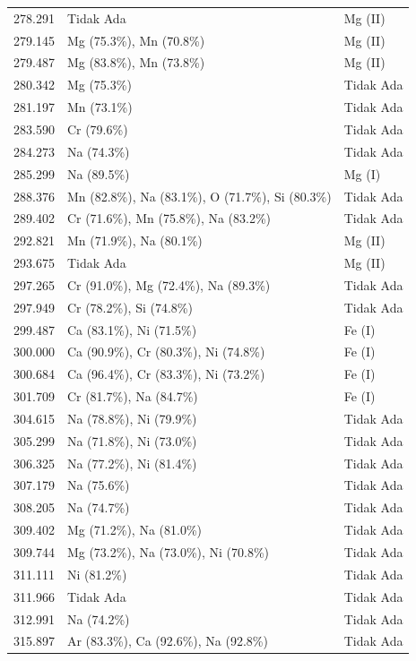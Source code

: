 \begin{onehalfspace}
\begin{longtable}{p{} p{} p{}}
    278.291 & Tidak Ada & Mg (II) \\
    279.145 & Mg (75.3\%), Mn (70.8\%) & Mg (II) \\
    279.487 & Mg (83.8\%), Mn (73.8\%) & Mg (II) \\
    280.342 & Mg (75.3\%) & Tidak Ada \\
    281.197 & Mn (73.1\%) & Tidak Ada \\
    283.590 & Cr (79.6\%) & Tidak Ada \\
    284.273 & Na (74.3\%) & Tidak Ada \\
    285.299 & Na (89.5\%) & Mg (I) \\
    288.376 & Mn (82.8\%), Na (83.1\%), O (71.7\%), Si (80.3\%) & Tidak Ada \\
    289.402 & Cr (71.6\%), Mn (75.8\%), Na (83.2\%) & Tidak Ada \\
    292.821 & Mn (71.9\%), Na (80.1\%) & Mg (II) \\
    293.675 & Tidak Ada & Mg (II) \\
    297.265 & Cr (91.0\%), Mg (72.4\%), Na (89.3\%) & Tidak Ada \\
    297.949 & Cr (78.2\%), Si (74.8\%) & Tidak Ada \\
    299.487 & Ca (83.1\%), Ni (71.5\%) & Fe (I) \\
    300.000 & Ca (90.9\%), Cr (80.3\%), Ni (74.8\%) & Fe (I) \\
    300.684 & Ca (96.4\%), Cr (83.3\%), Ni (73.2\%) & Fe (I) \\
    301.709 & Cr (81.7\%), Na (84.7\%) & Fe (I) \\
    304.615 & Na (78.8\%), Ni (79.9\%) & Tidak Ada \\
    305.299 & Na (71.8\%), Ni (73.0\%) & Tidak Ada \\
    306.325 & Na (77.2\%), Ni (81.4\%) & Tidak Ada \\
    307.179 & Na (75.6\%) & Tidak Ada \\
    308.205 & Na (74.7\%) & Tidak Ada \\
    309.402 & Mg (71.2\%), Na (81.0\%) & Tidak Ada \\
    309.744 & Mg (73.2\%), Na (73.0\%), Ni (70.8\%) & Tidak Ada \\
    311.111 & Ni (81.2\%) & Tidak Ada \\
    311.966 & Tidak Ada & Tidak Ada \\
    312.991 & Na (74.2\%) & Tidak Ada \\
    315.897 & Ar (83.3\%), Ca (92.6\%), Na (92.8\%) & Tidak Ada \\

\end{longtable}
\end{onehalfspace}
